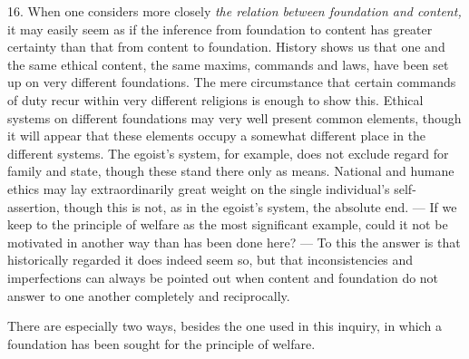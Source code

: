 \documentclass[12pt,a4paper,openany]{book}
\newcommand{\opage}[1]{\marginnote{\footnotesize\textit{[#1]}}}
\begin{document}
16. When one considers more closely \textit{the relation between foundation and content,} it may
easily seem as if the inference from foundation to content has greater certainty than that from
content to foundation. History shows us that one and the same ethical content,
\opage{55}the same maxims, commands and laws, have been set up on very different foundations. The mere
circumstance that certain commands of duty recur within very different religions is enough to show
this. Ethical systems on different foundations may very well present common elements, though it will
appear that these elements occupy a somewhat different place in the different systems. The egoist's
system, for example, does not exclude regard for family and state, though these stand there only as
means. National and humane ethics may lay extraordinarily great weight on the single individual's
self-assertion, though this is not, as in the egoist's system, the absolute end. --- If we keep to the
principle of welfare as the most significant example, could it not be motivated in another way than
has been done here? --- To this the answer is that historically regarded it does indeed seem so, but
that inconsistencies and imperfections can always be pointed out when content and foundation do not
answer to one another completely and reciprocally.

There are especially two ways, besides the one used in this inquiry, in which a foundation has been
sought for the principle of welfare.
\end{document}
